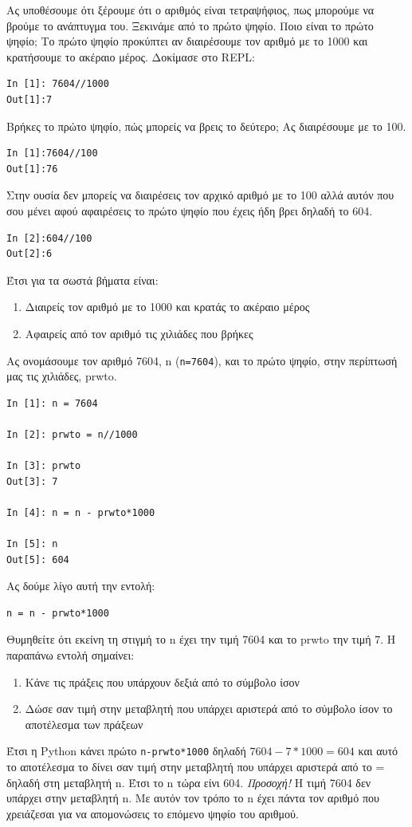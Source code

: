 Ας υποθέσουμε ότι ξέρουμε ότι ο αριθμός είναι τετραψήφιος, πως μπορούμε να βρούμε το ανάπτυγμα του. Ξεκινάμε από το πρώτο ψηφίο. Ποιο είναι το πρώτο ψηφίο; Το πρώτο ψηφίο προκύπτει αν διαιρέσουμε τον αριθμό με το 1000 και κρατήσουμε το ακέραιο μέρος.
Δοκίμασε στο REPL:
\begin{lstlisting}
In [1]: 7604//1000
Out[1]:7
\end{lstlisting}
Βρήκες το πρώτο ψηφίο, πώς μπορείς να βρεις το δεύτερο; Ας διαιρέσουμε με το 100.
\begin{lstlisting}
In [1]:7604//100
Out[1]:76
\end{lstlisting}
Στην ουσία δεν μπορείς να διαιρέσεις τον αρχικό αριθμό με το 100 αλλά αυτόν που σου μένει αφού αφαιρέσεις το πρώτο ψηφίο που έχεις ήδη βρει δηλαδή το 604.
\begin{lstlisting}
In [2]:604//100
Out[2]:6
\end{lstlisting}
Έτσι για τα σωστά βήματα είναι:
\begin{enumerate}
    \item Διαιρείς τον αριθμό με το 1000 και κρατάς το ακέραιο μέρος 
    \item Αφαιρείς από τον αριθμό τις χιλιάδες που βρήκες
\end{enumerate}
Ας ονομάσουμε τον αριθμό 7604, n (\lstinline{n=7604}), και το πρώτο ψηφίο, στην περίπτωσή μας τις χιλιάδες, prwto.
\begin{lstlisting}
In [1]: n = 7604

In [2]: prwto = n//1000

In [3]: prwto
Out[3]: 7

In [4]: n = n - prwto*1000

In [5]: n
Out[5]: 604
\end{lstlisting}

Ας δούμε λίγο αυτή την εντολή:
\begin{lstlisting}
n = n - prwto*1000
\end{lstlisting}
Θυμηθείτε ότι εκείνη τη στιγμή το n έχει την τιμή 7604 και το prwto την τιμή 7. Η παραπάνω εντολή σημαίνει:
\begin{enumerate}
    \item Κάνε τις πράξεις που υπάρχουν δεξιά από το σύμβολο ίσον
    \item Δώσε σαν τιμή στην μεταβλητή που υπάρχει αριστερά από το σύμβολο ίσον το αποτέλεσμα των πράξεων
\end{enumerate}
Έτσι η Python κάνει πρώτο \lstinline{n-prwto*1000} δηλαδή $7604-7*1000 = 604$ και αυτό το αποτέλεσμα το δίνει σαν τιμή στην μεταβλητή που υπάρχει αριστερά από το = δηλαδή στη μεταβλητή n. Έτσι το n τώρα είνι 604. \emph{Προσοχή!} Η τιμή 7604 δεν υπάρχει στην μεταβλητή n. Με αυτόν τον τρόπο το n έχει πάντα τον αριθμό που χρειάζεσαι για να απομονώσεις το επόμενο ψηφίο του αριθμού.

